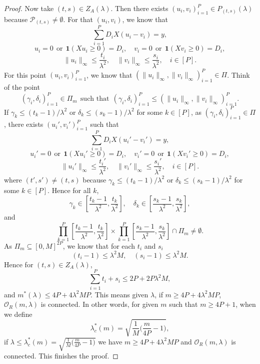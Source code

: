 \documentclass{article}
\begin{document}
\begin{proof}
Now take $(t, s) \in Z_A(\lambda)$. Then there exists $(u_i, v_i)_{i=1}^{P} \in P_{(t,s)}(\lambda)$ because $\mathcal{P}_{(t,s)} \neq \emptyset$. For that $(u_i, v_i)$, we know that 
\[
\sum_{i=1}^{P} D_iX(u_i - v_i) = y,
\]
\[
u_i = 0 \ \  \textrm{or} \ \ \mathbf{1}(Xu_i \geq 0) = D_i, \quad v_i = 0 \ \  \textrm{or} \ \ \mathbf{1}(Xv_i \geq 0) = D_i,
\]
\[
\| u_i \|_\infty \leq \frac{t_i}{\lambda^2}, \quad \| v_i \|_\infty \leq \frac{s_i}{\lambda^2}, \quad i \in [P].
\]
For this point $(u_i, v_i)_{i=1}^{P}$, we know that $(\|u_i\|_\infty, \|v_i\|_\infty)_{i=1}^{P} \in \Pi$. Think of the point 
\[
(\gamma_i, \delta_i)_{i=1}^{P} \in \Pi_m \ \ \textrm{such that} \ \ (\gamma_i, \delta_i)_{i=1}^{P} \leq (\|u_i\|_\infty, \|v_i\|_\infty)_{i=1}^{P}.
\]
If $\gamma_k \leq (t_k - 1)/\lambda^2$ or $\delta_k \leq (s_k - 1)/\lambda^2$ for some $k \in [P]$, as $(\gamma_i, \delta_i)_{i=1}^{P} \in \Pi$, there exists $(u_i', v_i')_{i=1}^{P}$ such that 
\[
\sum_{i=1}^{P} D_iX(u_i' - v_i') = y,
\]
\[
u_i' = 0 \ \  \textrm{or} \ \ \mathbf{1}(Xu_i' \geq 0) = D_i, \quad v_i' = 0 \ \  \textrm{or} \ \ \mathbf{1}(Xv_i' \geq 0) = D_i,
\]
\[
\| u_i' \|_\infty \leq \frac{t_i'}{\lambda^2}, \quad \| v_i'\|_\infty \leq \frac{s_i'}{\lambda^2}, \quad i \in [P].
\]
where $(t',s') \neq (t,s)$ because $\gamma_k \leq (t_k - 1)/\lambda^2$ or $\delta_k \leq (s_k - 1)/\lambda^2$ for some $k \in [P]$. Hence for all $k$, 
\[
\gamma_k \in \left[\frac{t_k-1}{\lambda^2}, \frac{t_k}{\lambda^2}\right], \quad \delta_k \in \left[\frac{s_k-1}{\lambda^2}, \frac{s_k}{\lambda^2}\right],
\]
and 
\[
\prod_{k=1}^{P} \left[\frac{t_k-1}{\lambda^2}, \frac{t_k}{\lambda^2}\right] \times \prod_{k=1}^{P} \left[\frac{s_k-1}{\lambda^2}, \frac{s_k}{\lambda^2}\right] \cap \Pi_m \neq \emptyset.
\]
As $\Pi_m \subseteq [0,M]^{2P}$, we know that for each $t_i$ and $s_i$ 
\[
(t_i-1) \leq \lambda^2M, \quad (s_i-1)\leq \lambda^2M.
\]
Hence for $(t,s) \in Z_A(\lambda)$, 
\[
\sum_{i=1}^{P} t_i + s_i \leq 2P + 2P\lambda^2M,
\]
and $m^{*}(\lambda) \leq 4P + 4\lambda^2MP$. This means given $\lambda$, if $m \geq 4P + 4\lambda^2MP$, $\mathcal{O}_R(m, \lambda)$ is connected. In other words, for given $m$ such that $m \geq 4P+1$, when we define 
\[
\lambda_c^{*}(m) = \sqrt{\frac{1}{M}\Big(\frac{m}{4P} - 1\Big)},
\]
if $\lambda \leq \lambda_c^{*}(m) = \sqrt{\frac{1}{M}\Big(\frac{m}{4P} - 1\Big)}$ we have $m \geq 4P + 4\lambda^2MP$ and $\mathcal{O}_R(m, \lambda)$ is connected. This finishes the proof.
\end{proof}
\end{document}
